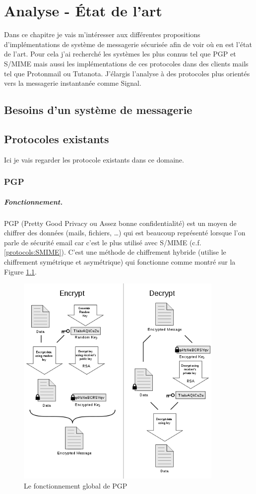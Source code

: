 \chapter{Analyse - État de l'art}
\label{ch:analysis}
Dans ce chapitre je vais m'intéresser aux différentes propositions d'implémentations de système de messagerie sécurisée afin de voir où en est l'état de l'art. Pour cela j'ai recherché les systèmes les plus connus tel que PGP et S/MIME mais aussi les implémentations de ces protocoles dans des clients mails tel que Protonmail ou Tutanota. J'élargis l'analyse à des protocoles plus orientés vers la messagerie instantanée comme Signal.
\section{Besoins d'un système de messagerie}
\section{Protocoles existants}
Ici je vais regarder les protocole existants dans ce domaine.
\subsection{PGP}
\paragraph*{Fonctionnement.}
PGP (Pretty Good Privacy ou Assez bonne confidentialité) est un moyen de chiffrer des données (mails, fichiers, …) qui est beaucoup représenté lorsque l’on parle de sécurité email car c’est le plus utilisé avec S/MIME (c.f. \ref{protocols:SMIME}). C’est une méthode de chiffrement hybride (utilise le chiffrement symétrique et asymétrique) qui fonctionne comme montré sur la Figure \ref{fig:PGP_101}.

\begin{figure}[h!]
\includegraphics[width=10cm]{images/PGP_101.png}
\centering
\caption{Le fonctionnement global de PGP}
\label{fig:PGP_101}
\end{figure}

